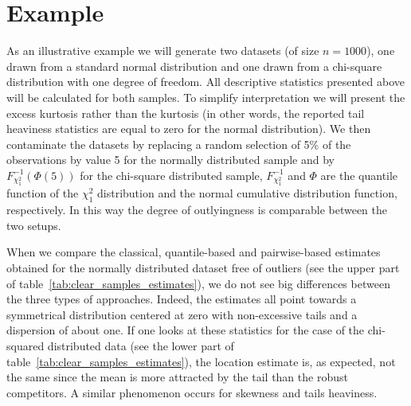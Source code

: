 
\section{Example}                                                               

As an illustrative example we will generate two datasets (of size $n = 1000$),
one drawn from a standard normal distribution and one drawn from a chi-square
distribution with one degree of freedom. All descriptive statistics presented
above will be calculated for both samples. To simplify interpretation we will
present the excess kurtosis rather than the kurtosis (in other words, the
reported tail heaviness statistics are equal to zero for the normal
distribution). We then contaminate the datasets by replacing a random selection
of 5\% of the observations by value 5 for the normally distributed sample and
by $F_{\chi_1^2}^{-1}(\Phi(5))$ for the chi-square distributed sample,
$F_{\chi_1^2}^{-1}$ and $\Phi$ are the quantile function of the $\chi_1^2$
distribution and the normal cumulative distribution function, respectively. In
this way the degree of outlyingness is comparable between the two setups.

When we compare the classical, quantile-based and pairwise-based estimates
obtained for the normally distributed dataset free of outliers (see the upper
part of table~\ref{tab:clear_samples_estimates}), we do not see big differences
between the three types of approaches. Indeed, the estimates all point towards
a symmetrical distribution centered at zero with non-excessive tails and a
dispersion of about one. If one looks at these statistics for the case of the
chi-squared distributed data (see the lower part of
table~\ref{tab:clear_samples_estimates}), the location estimate is, as
expected, not the same since the mean is more attracted by the tail than the
robust competitors. A similar phenomenon occurs for skewness and tails
heaviness.


